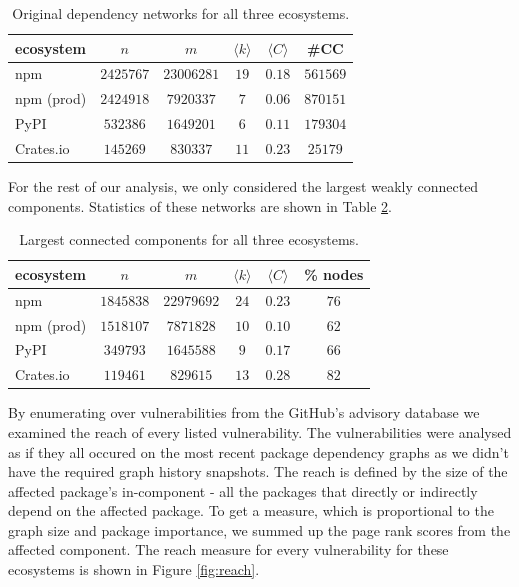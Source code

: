 \documentclass[9pt,twocolumn,twoside]{pnas-report}
\begin{document}
\begin{table}[h]\centering%
	\caption{Original dependency networks for all three ecosystems.}
	\begin{tabular}{l|ccccc}
		ecosystem  & $n$       & $m$        & $\langle k\rangle$ & $\langle C\rangle$ & \#CC     \\\hline
		npm        & $2425767$ & $23006281$ & $19$               & $0.18$             & $561569$ \\
		npm (prod) & $2424918$ & $7920337$  & $7$                & $0.06$             & $870151$ \\
		PyPI       & $532386$  & $1649201$  & $6$                & $0.11$             & $179304$ \\
		Crates.io  & $145269$  & $830337$   & $11$               & $0.23$             & $25179$  \\
	\end{tabular}
	\label{tab:basic_stats}
\end{table}

For the rest of our analysis, we only considered the largest weakly connected components.
Statistics of these networks are shown in Table \ref{tab:lcc_stats}.

\begin{table}[h]\centering%
	\caption{Largest connected components for all three ecosystems.}
	\begin{tabular}{l|ccccc}
		ecosystem  & $n$       & $m$        & $\langle k\rangle$ & $\langle C\rangle$ & \% nodes \\\hline
		npm        & $1845838$ & $22979692$ & $24$               & $0.23$             & $76$     \\
		npm (prod) & $1518107$ & $7871828$  & $10$               & $0.10$             & $62$     \\
		PyPI       & $349793$  & $1645588$  & $9$                & $0.17$             & $66$     \\
		Crates.io  & $119461$  & $829615$   & $13$               & $0.28$             & $82$     \\
	\end{tabular}
	\label{tab:lcc_stats}
\end{table}

By enumerating over vulnerabilities from the GitHub's advisory database we examined the reach of every listed vulnerability.
The vulnerabilities were analysed as if they all occured on the most recent package dependency graphs as we didn't have the required graph history snapshots.
The reach is defined by the size of the affected package's in-component - all the packages that directly or indirectly depend on the affected package.
To get a measure, which is proportional to the graph size and package importance, we summed up the page rank scores from the affected component.
The reach measure for every vulnerability for these ecosystems is shown in Figure \ref{fig:reach}.
\end{document}
